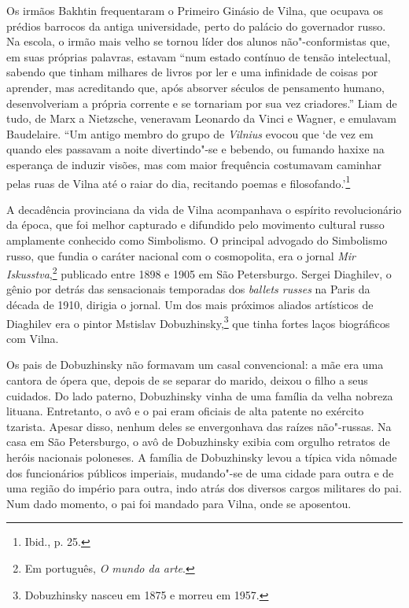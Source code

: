 Os irmãos Bakhtin frequentaram o Primeiro Ginásio de Vilna, que ocupava
os prédios barrocos da antiga universidade, perto do palácio do
governador russo. Na escola, o irmão mais velho se tornou líder dos
alunos não"-conformistas que, em suas próprias palavras, estavam ``num
estado contínuo de tensão intelectual, sabendo que tinham milhares de
livros por ler e uma infinidade de coisas por aprender, mas acreditando
que, após absorver séculos de pensamento humano, desenvolveriam a
própria corrente e se tornariam por sua vez criadores.'' Liam de tudo,
de Marx a Nietzsche, veneravam Leonardo da Vinci e Wagner, e emulavam
Baudelaire. ``Um antigo membro do grupo de \textit{Vilnius} evocou que `de vez em
quando eles passavam a noite divertindo"-se e bebendo, ou fumando haxixe
na esperança de induzir visões, mas com maior frequência costumavam
caminhar pelas ruas de Vilna até o raiar do dia, recitando poemas e
filosofando.'\footnote{Ibid., p. 25.}

\asterisc

A decadência provinciana da vida de Vilna acompanhava o espírito
revolucionário da época, que foi melhor capturado e difundido pelo
movimento cultural russo amplamente conhecido como Simbolismo. O
principal advogado do Simbolismo russo, que fundia o caráter nacional
com o cosmopolita, era o jornal \textit{Mir Iskusstva},\footnote{Em português, \textit{O mundo da
arte}.} publicado entre 1898 e 1905 em São Petersburgo. Sergei
Diaghilev, o gênio por detrás das sensacionais temporadas dos
\textit{ballets russes} na Paris da década de 1910, dirigia o jornal. Um
dos mais próximos aliados artísticos de Diaghilev era o pintor Mstislav
Dobuzhinsky,\footnote{Dobuzhinsky nasceu em 1875 e morreu em 1957.} que tinha fortes laços biográficos com Vilna.

Os pais de Dobuzhinsky não formavam um casal convencional: a mãe era uma
cantora de ópera que, depois de se separar do marido, deixou o filho a
seus cuidados. Do lado paterno, Dobuzhinsky vinha de uma família da
velha nobreza lituana. Entretanto, o avô e o pai eram oficiais de alta
patente no exército tzarista. Apesar disso, nenhum deles se envergonhava
das raízes não"-russas. Na casa em São Petersburgo, o avô de Dobuzhinsky
exibia com orgulho retratos de heróis nacionais poloneses. A família de
Dobuzhinsky levou a típica vida nômade dos funcionários públicos
imperiais, mudando"-se de uma cidade para outra e de uma região do
império para outra, indo atrás dos diversos cargos militares do pai. Num
dado momento, o pai foi mandado para Vilna, onde se aposentou.

